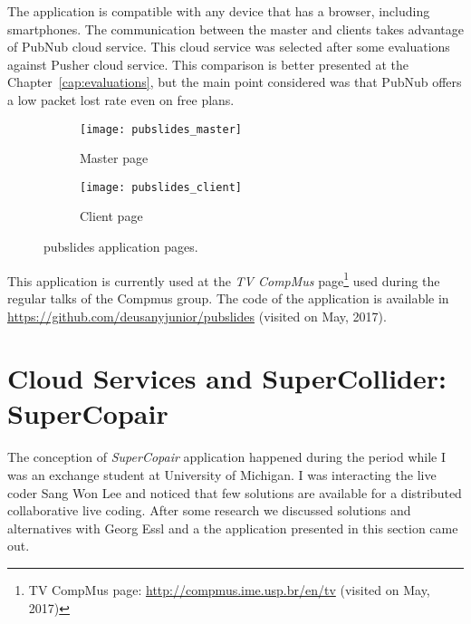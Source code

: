 The application is compatible with any device that has a browser, including smartphones.
The communication between the master and clients takes advantage of PubNub cloud service.
This cloud service was selected after some evaluations against Pusher cloud service.
This comparison is better presented at the Chapter~\ref{cap:evaluations}, but the main point considered was that PubNub offers a low packet lost rate even on free plans.

\begin{figure*}[!ht]
	\centering
	\begin{subfigure}{.45\textwidth}
		\texttt{[image: pubslides\_master]}
		\caption{Master page}
		\label{fig:pubslidesmaster}
	\end{subfigure}
	\begin{subfigure}{.45\textwidth}
		\texttt{[image: pubslides\_client]}
		\caption{Client page}
		\label{fig:pubslidesclient}
	\end{subfigure}
	
	\caption{pubslides application pages.}
	\label{fig:pubslidesapplication}
\end{figure*}


This application is currently used at the \textit{TV CompMus} page\footnote{TV CompMus page: \url{http://compmus.ime.usp.br/en/tv} (visited on May, 2017)} used during the regular talks of the Compmus group.
The code of the application is available in \url{https://github.com/deusanyjunior/pubslides} (visited on May, 2017).

\section{Cloud Services and SuperCollider: SuperCopair}
\label{apesec:appsupercopair}

The conception of \textit{SuperCopair} application happened during the period while I was an exchange student at University of Michigan.
I was interacting the live coder Sang Won Lee and noticed that few solutions are available for a distributed collaborative live coding.
After some research we discussed solutions and alternatives with Georg Essl and a the application presented in this section came out.

